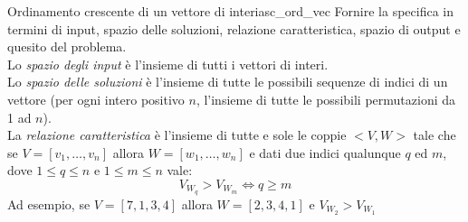\documentclass[12pt]{report}
\newcommand{\nmu}{}
\begin{document}
   	\begin{example}{\nmu Ordinamento crescente di un vettore di interi}{asc_ord_vec}
   		Fornire la specifica in termini di input, spazio delle soluzioni, relazione caratteristica, spazio di output e quesito del problema. \\
   		Lo \textit{spazio degli input} è l'insieme di tutti i vettori di interi. \\
   		Lo \textit{spazio delle soluzioni} è l'insieme di tutte le possibili sequenze di indici di un vettore (per ogni intero positivo $n$, l'insieme di tutte le possibili permutazioni da 1 ad $n$). \\
   		La \textit{relazione caratteristica} è l'insieme di tutte e sole le coppie $<V, W>$ tale che se $V = [v_1, \dots, v_n]$ allora $W = [w_1, \dots, w_n]$ e dati due indici qualunque $q$ ed $m$, dove $1 \leq q \leq n$ e $1 \leq m \leq n$ vale:
   		\[
   		V_{W_q} > V_{W_m} \iff q \geq m
   		\]
   		Ad esempio, se $V = [7, 1, 3, 4]$ allora $W = [2, 3, 4, 1]$ e $V_{W_2} > V_{W_1}$
   	\end{example}
\end{document}
